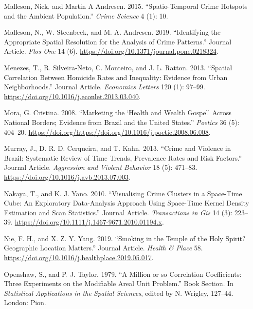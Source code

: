 \documentclass[smallextended]{svjour3}       %
\begin{document}
\leavevmode\hypertarget{ref-Malleson2015spatio}{}%
Malleson, Nick, and Martin A Andresen. 2015. ``Spatio-Temporal Crime
Hotspots and the Ambient Population.'' \emph{Crime Science} 4 (1): 10.

\leavevmode\hypertarget{ref-Malleson2019identifying}{}%
Malleson, N., W. Steenbeek, and M. A. Andresen. 2019. ``Identifying the
Appropriate Spatial Resolution for the Analysis of Crime Patterns.''
Journal Article. \emph{Plos One} 14 (6).
\url{https://doi.org/10.1371/journal.pone.0218324}.

\leavevmode\hypertarget{ref-Menezes2013spatial}{}%
Menezes, T., R. Silveira-Neto, C. Monteiro, and J. L. Ratton. 2013.
``Spatial Correlation Between Homicide Rates and Inequality: Evidence
from Urban Neighborhoods.'' Journal Article. \emph{Economics Letters}
120 (1): 97--99. \url{https://doi.org/10.1016/j.econlet.2013.03.040}.

\leavevmode\hypertarget{ref-Mora2008marketing}{}%
Mora, G. Cristina. 2008. ``Marketing the `Health and Wealth Gospel'
Across National Borders; Evidence from Brazil and the United States.''
\emph{Poetics} 36 (5): 404--20.
\url{https://doi.org/https://doi.org/10.1016/j.poetic.2008.06.008}.

\leavevmode\hypertarget{ref-Murray2013crime}{}%
Murray, J., D. R. D. Cerqueira, and T. Kahn. 2013. ``Crime and Violence
in Brazil: Systematic Review of Time Trends, Prevalence Rates and Risk
Factors.'' Journal Article. \emph{Aggression and Violent Behavior} 18
(5): 471--83. \url{https://doi.org/10.1016/j.avb.2013.07.003}.

\leavevmode\hypertarget{ref-Nakaya2010visualizing}{}%
Nakaya, T., and K. J. Yano. 2010. ``Visualising Crime Clusters in a
Space-Time Cube: An Exploratory Data-Analysis Approach Using Space-Time
Kernel Density Estimation and Scan Statistics.'' Journal Article.
\emph{Transactions in Gis} 14 (3): 223--39.
\url{https://doi.org/10.1111/j.1467-9671.2010.01194.x}.

\leavevmode\hypertarget{ref-Nie2019smoking}{}%
Nie, F. H., and X. Z. Y. Yang. 2019. ``Smoking in the Temple of the Holy
Spirit? Geographic Location Matters.'' Journal Article. \emph{Health \&
Place} 58. \url{https://doi.org/10.1016/j.healthplace.2019.05.017}.

\leavevmode\hypertarget{ref-Openshaw1979million}{}%
Openshaw, S., and P. J. Taylor. 1979. ``A Million or so Correlation
Coefficients: Three Experiments on the Modifiable Areal Unit Problem.''
Book Section. In \emph{Statistical Applications in the Spatial
Sciences}, edited by N. Wrigley, 127--44. London: Pion.
\end{document}
